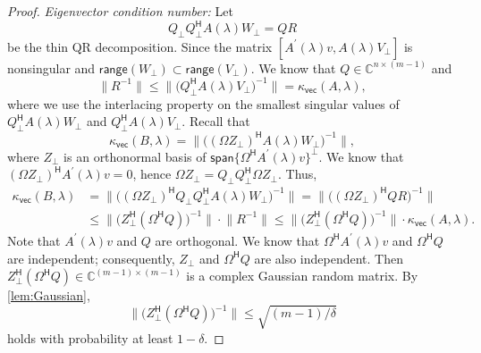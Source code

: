 \documentclass[10pt,a4paper]{amsart}
\newcommand{\C}{\mathbb{C}}
\newcommand{\Htran}{\mathsf{H}}
\providecommand{\bignorm}[1]{\bigl\lVert#1\bigr\rVert}
\newcommand{\kvec}{\kappa_{\mathsf{vec}}}
\providecommand{\norm}[1]{\lVert#1\rVert}
\newcommand{\range}{\mathsf{range}}
\providecommand{\spa}[1]{\mathsf{span}\{#1\}}
\begin{document}
\begin{proof}
    \emph{Eigenvector condition number:} Let 
    \begin{equation*}
        Q_{\perp}Q_{\perp}^{\Htran}A(\lambda)W_{\perp} = QR
    \end{equation*}
    be the thin QR decomposition. Since the matrix $[A^{\prime}(\lambda)v,A(\lambda)V_{\perp}]$ is nonsingular and $\range(W_{\perp})\subset \range(V_{\perp})$. We know that $Q\in\C^{n\times (m-1)}$ and
    \begin{equation*}
        \norm{R^{-1}} \leq \bignorm{\bigl(Q_{\perp}^{\Htran}A(\lambda)V_{\perp}\bigr)^{-1}} = \kvec(A,\lambda),
    \end{equation*}
    where we use the interlacing property on the smallest singular values of $Q_{\perp}^{\Htran}A(\lambda)W_{\perp}$ and $Q_{\perp}^{\Htran}A(\lambda)V_{\perp}$. 
    Recall that 
    \begin{equation*}
        \kvec(B,\lambda) =  \bignorm{\bigl((\Omega Z_{\perp})^{\Htran}A(\lambda)W_{\perp}\bigr)^{-1}}, 
    \end{equation*}
    where $Z_{\perp}$ is an orthonormal basis of $\spa{\Omega^{\Htran}A^{\prime}(\lambda)v}^{\perp}$. We know that $(\Omega Z_{\perp})^{\Htran}A^{\prime}(\lambda)v=0$, hence $\Omega Z_{\perp} = Q_{\perp}Q_{\perp}^{\Htran}\Omega Z_{\perp}$. Thus, 
    \begin{equation*}
        \begin{aligned}
            \kvec(B,\lambda) &= 
        \bignorm{\bigl((\Omega Z_{\perp})^{\Htran}Q_{\perp}Q_{\perp}^{\Htran}A(\lambda)W_{\perp}\bigr)^{-1}} = \bignorm{\bigl((\Omega Z_{\perp})^{\Htran}QR\bigr)^{-1}} \\ 
        &\leq \bignorm{\bigl(Z_{\perp}^{\Htran}(\Omega^{\Htran}Q)\bigr)^{-1}}\cdot \norm{R^{-1}}\leq \bignorm{\bigl(Z_{\perp}^{\Htran}(\Omega^{\Htran}Q)\bigr)^{-1}}\cdot \kvec(A,\lambda).        
        \end{aligned}
    \end{equation*}
    Note that $A^{\prime}(\lambda)v$ and $Q$ are orthogonal. We know that $\Omega^{\Htran}A^{\prime}(\lambda)v$ and $\Omega^{\Htran}Q$ are independent; consequently, $Z_{\perp}$ and $\Omega^{\Htran}Q$ are also independent. Then $Z_{\perp}^{\Htran}(\Omega^{\Htran}Q)\in\C^{(m-1)\times (m-1)}$ is a complex Gaussian random matrix. By \cref{lem:Gaussian},  
    \begin{equation*}
        \bignorm{\bigl(Z_{\perp}^{\Htran}(\Omega^{\Htran}Q)\bigr)^{-1}}\leq \sqrt{(m-1)/\delta}
    \end{equation*} 
    holds with probability at least $1-\delta$. 
\end{proof}
\end{document}
